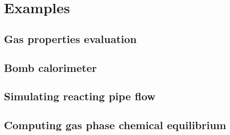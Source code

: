 \chapter{Examples}
\label{chap:examples}

\section{Gas properties evaluation}

\section{Bomb calorimeter}

\section{Simulating reacting pipe flow}

\section{Computing gas phase chemical equilibrium}

